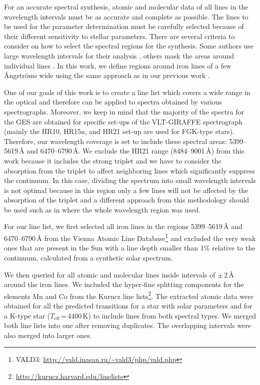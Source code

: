 \documentclass[fleqn,usenatbib]{mnras}
\begin{document}
For an accurate spectral synthesis, atomic and molecular data of all lines in the wavelength intervals must be as accurate 
and complete as possible. The lines to be used for the parameter determination must be carefully selected because of their different sensitivity to stellar parameters. 
There are several criteria to consider on how to select the spectral regions for the synthesis. Some authors use large wavelength intervals 
for their analysis \citep[e.g. SME;][]{valenti05}, others mask the areas around individual lines \citep[e.g. iSpec;][]{blanco2014a}. 
In this work, we define regions around iron lines of a few \AA{}ngstr\"{o}ms wide using the same approach as in our previous work \citep{Tsantaki2014}.

One of our goals of this work is to create a line list which covers a wide range in the optical and therefore can be applied to spectra obtained by 
various spectrographs. Moreover, we keep in mind that the majority of the spectra for the GES are obtained for specific set-ups of the VLT-GIRAFFE spectrograph 
(mainly the HR10, HR15n, and HR21 set-up are used for FGK-type stars). Therefore, our wavelength coverage is set to include these spectral areas: 
5399--5619\,\AA{} and 6470--6790\,\AA{}. We exclude the HR21 range (8484--9001\,\AA{}) from this work because it includes the strong  triplet and we have to consider 
the absorption from the triplet to affect neighboring lines which significantly suppress the continuum. In this case, dividing the spectrum into small wavelength intervals is not optimal 
because in this region only a few lines will not be affected by the absorption of the triplet and a different approach from this methodology should be used such as in \cite{Kordopatis2011} 
where the whole wavelength region was used.

For our line list, we first selected all iron lines in the regions 5399--5619\,\AA{} and 6470--6790\,\AA{} from the Vienna Atomic Line 
Database\footnote{VALD3: \url{http://vald.inasan.ru/~vald3/php/vald.php}} 
\citep[VALD3;][]{piskunov95, kupka99, Ryabchikova2015} and excluded the very weak ones that are present in the Sun with a line depth smaller than 1\% relative to the continuum, calculated from 
a synthetic solar spectrum.

We then queried for all atomic and molecular lines inside intervals of $\pm$\,2\,\AA{} around the iron lines. 
We included the hyper-fine splitting components for the elements Mn and Co from the Kurucz line lists\footnote{\url{http://kurucz.harvard.edu/linelists}}. 
The extracted atomic data were obtained for all the predicted transitions for a star with solar parameters and for a K-type star ($T_{\mathrm{eff}}$\,=\,4400\,K) to include lines 
from both spectral types. We merged both line lists into one after removing duplicates. The overlapping intervals were also merged into larger ones.
\end{document}
